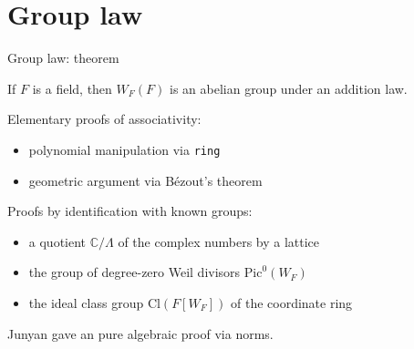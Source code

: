 \documentclass[10pt]{beamer}
\begin{document}
\section{Group law}

\begin{frame}[t]{Group law: theorem}

\begin{theorem}
If $ F $ is a field, then $ W_F(F) $ is an abelian group under an addition law.
\end{theorem}

\pause

\vspace{0.5cm}

Elementary proofs of associativity:
\begin{itemize}
\item polynomial manipulation via \texttt{ring}

\pause

\item geometric argument via B\'ezout's theorem
\end{itemize}

\pause

Proofs by identification with known groups:
\begin{itemize}
\item a quotient $ \mathbb{C} / \Lambda $ of the complex numbers by a lattice

\pause

\item the group of degree-zero Weil divisors $ \mathrm{Pic}^0(W_F) $

\pause

\item the ideal class group $ \mathrm{Cl}(F[W_F]) $ of the coordinate ring
\end{itemize}

\pause

Junyan gave an pure algebraic proof via norms.

\end{frame}
\end{document}
